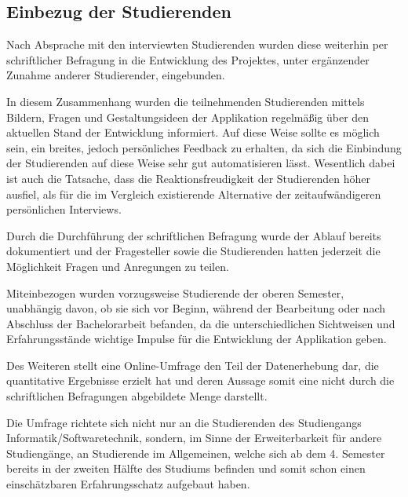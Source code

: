 \documentclass[bibliography=totoc,listof=totoc,BCOR=5mm,DIV=12,oneside]{scrbook}
\begin{document}
\subsection{Einbezug der Studierenden}
\par Nach Absprache mit den interviewten Studierenden wurden diese weiterhin per schriftlicher Befragung in die Entwicklung des Projektes, unter ergänzender Zunahme anderer Studierender, eingebunden.
\par In diesem Zusammenhang wurden die teilnehmenden Studierenden mittels Bildern, Fragen und Gestaltungsideen der Applikation regelmäßig über den aktuellen Stand der Entwicklung informiert. Auf diese Weise sollte es möglich sein, ein breites, jedoch persönliches Feedback zu erhalten, da sich die Einbindung der Studierenden auf diese Weise sehr gut automatisieren lässt. Wesentlich dabei ist auch die Tatsache, dass die Reaktionsfreudigkeit der Studierenden höher ausfiel, als für die im Vergleich existierende Alternative der zeitaufwändigeren persönlichen Interviews.
\par Durch die Durchführung der schriftlichen Befragung wurde der Ablauf bereits dokumentiert und der Fragesteller sowie die Studierenden hatten jederzeit die Möglichkeit Fragen und Anregungen zu teilen.
\par Miteinbezogen wurden vorzugsweise Studierende der oberen Semester, unabhängig davon, ob sie sich vor Beginn, während der Bearbeitung oder nach Abschluss der Bachelorarbeit befanden, da die unterschiedlichen Sichtweisen und Erfahrungsstände wichtige Impulse für die Entwicklung der Applikation geben.
\par \medskip Des Weiteren stellt eine Online-Umfrage den Teil der Datenerhebung dar, die quantitative Ergebnisse erzielt hat und deren Aussage somit eine nicht durch die schriftlichen Befragungen abgebildete Menge darstellt.
\par Die Umfrage richtete sich nicht nur an die Studierenden des Studiengangs Informatik/Softwaretechnik, sondern, im Sinne der Erweiterbarkeit für andere Studiengänge, an Studierende im Allgemeinen, welche sich ab dem 4. Semester bereits in der zweiten Hälfte des Studiums befinden und somit schon einen einschätzbaren Erfahrungsschatz aufgebaut haben.
\end{document}
